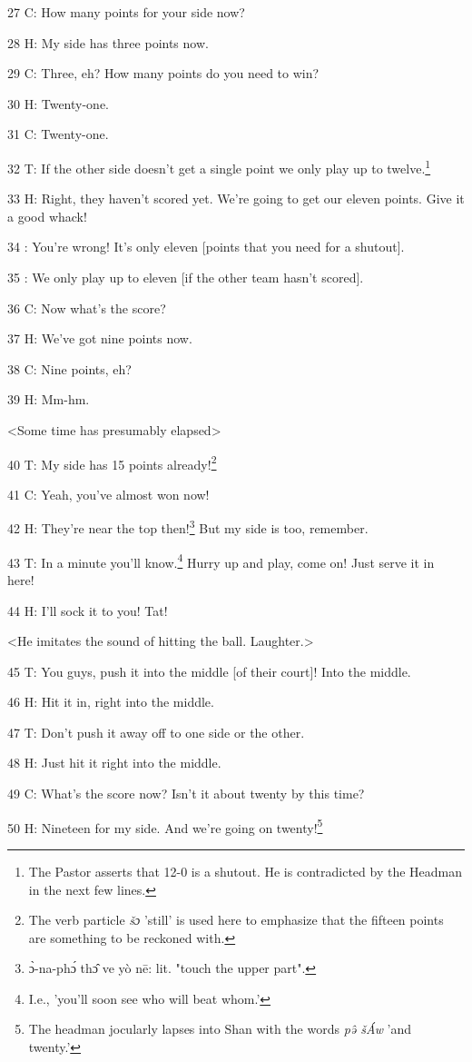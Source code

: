 27 C: How many points for your side now?

28 H: My side has three points now.

29 C: Three, eh? How many points do you need to win?

30 H: Twenty-one.

31 C: Twenty-one.

32 T: If the other side doesn't get a single point we only play up to twelve.\footnote{The Pastor asserts that 12-0 is a shutout. He is contradicted by the Headman in the next few lines.}

33 H: Right, they haven't scored yet. We're going to get our eleven points. Give
it a good whack!

34 : You're wrong! It's only eleven [points that you need for a shutout].

35 : We only play up to eleven [if the other team hasn't scored].

36 C: Now what's the score?

37 H: We've got nine points now.

38 C: Nine points, eh?

39 H: Mm-hm.

<Some time has presumably elapsed>

40 T: My side has 15 points already!\footnote{The verb particle\textit{ šɔ} 'still' is used here to emphasize that the fifteen points are something to be reckoned with.}

41 C: Yeah, you've almost won now!

42 H: They're near the top then!\footnote{ɔ̀-na-phɔ́ thɔ̂ ve yò nē: lit. "touch the upper part".} But my side is too, remember.

43 T: In a minute you'll know.\footnote{I.e., 'you'll soon see who will beat whom.'} Hurry up and play, come on! Just serve it in
here!

44 H: I'll sock it to you! Tat!

<He imitates the sound of hitting the ball. Laughter.>

45 T: You guys, push it into the middle [of their court]! Into the middle.

46 H: Hit it in, right into the middle.

47 T: Don't push it away off to one side or the other.

48 H: Just hit it right into the middle.

49 C: What's the score now? Isn't it about twenty by this time?

50 H: Nineteen for my side. And we're going on twenty!\footnote{The headman jocularly lapses into Shan with the words \textit{pə̂ šÁw} 'and twenty.'}


